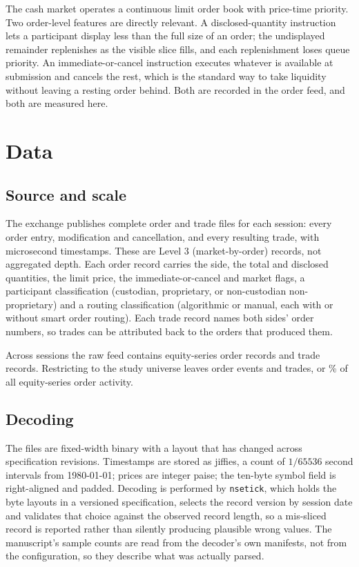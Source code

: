 \documentclass[11pt,a4paper]{article}
\begin{document}
The cash market operates a continuous limit order book with price-time priority. Two
order-level features are directly relevant. A disclosed-quantity instruction lets a
participant display less than the full size of an order; the undisplayed remainder
replenishes as the visible slice fills, and each replenishment loses queue priority. An
immediate-or-cancel instruction executes whatever is available at submission and cancels the
rest, which is the standard way to take liquidity without leaving a resting order behind.
Both are recorded in the order feed, and both are measured here.


\section{Data}\label{sec:data}

\subsection{Source and scale}

The exchange publishes complete order and trade files for each session: every order entry,
modification and cancellation, and every resulting trade, with microsecond timestamps. These
are Level 3 (market-by-order) records, not aggregated depth. Each order record carries the
side, the total and disclosed quantities, the limit price, the immediate-or-cancel and
market flags, a participant classification (custodian, proprietary, or non-custodian
non-proprietary) and a routing classification (algorithmic or manual, each with or without
smart order routing). Each trade record names both sides' order numbers, so trades can be
attributed back to the orders that produced them.

Across \SampleSessionsParsed{} sessions the raw feed contains \SampleOrderEventsRead{}
equity-series order records and \SampleTradesRead{} trade records. Restricting to the study
universe leaves \SampleOrderEvents{} order events and \SampleTrades{} trades, or
\SampleUniverseSharePct{}\% of all equity-series order activity.

\subsection{Decoding}

The files are fixed-width binary with a layout that has changed across specification
revisions. Timestamps are stored as jiffies, a count of \(1/65536\) second intervals from
1980-01-01; prices are integer paise; the ten-byte symbol field is right-aligned and padded.
Decoding is performed by \texttt{nsetick}, which holds the byte layouts in a versioned
specification, selects the record version by session date and validates that choice against
the observed record length, so a mis-sliced record is reported rather than silently
producing plausible wrong values. The manuscript's sample counts are read from the decoder's
own manifests, not from the configuration, so they describe what was actually parsed.
\end{document}
